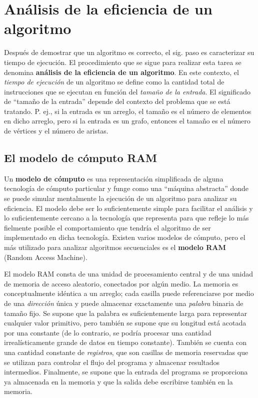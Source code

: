 \chapter{Análisis de la eficiencia de un algoritmo}

Después de demostrar que un algoritmo es correcto, el sig. paso es caracterizar su tiempo de ejecución. 
El procedimiento que se sigue para realizar esta tarea se denomina \textbf{análisis de la eficiencia de un algoritmo}. 
En este contexto, el \emph{tiempo de ejecución} de un algoritmo se define como la cantidad total de instrucciones que se ejecutan en función del \emph{tamaño de la entrada}. 
El significado de ``tamaño de la entrada'' depende del contexto del problema que se está tratando.
P. ej., si la entrada es un arreglo, el tamaño es el número de elementos en dicho arreglo, pero si la entrada es un grafo, entonces el tamaño es el número de vértices y el número de aristas. 

\section{El modelo de cómputo RAM}

Un \textbf{modelo de cómputo} es una representación simplificada de alguna tecnología de cómputo particular y funge como una ``máquina abstracta'' donde se puede simular mentalmente la ejecución de un algoritmo para analizar su eficiencia. 
El modelo debe ser lo suficientemente simple para facilitar el análisis y lo suficientemente cercano a la tecnología que representa para que refleje lo más fielmente posible el comportamiento que tendría el algoritmo de ser implementado en dicha tecnología. Existen varios modelos de cómputo, pero el más utilizado para analizar algoritmos secuenciales es el \textbf{modelo RAM} (Random Access Machine). 

El modelo RAM consta de una unidad de procesamiento central y de una unidad de memoria de acceso aleatorio, conectados por algún medio.
La memoria es conceptualmente idéntica a un arreglo; cada casilla puede referenciarse por medio de una \emph{dirección} única y puede almacenar exactamente una \emph{palabra} binaria de tamaño fijo.
Se supone que la palabra es suficientemente larga para representar cualquier valor primitivo, pero también se supone que su longitud está acotada por una constante (de lo contrario, se podría procesar una cantidad irrealísticamente grande de datos en tiempo constante).
También se cuenta con una cantidad constante de \emph{registros}, que son casillas de memoria reservadas que se utilizan para controlar el flujo del programa y almacenar resultados intermedios.
Finalmente, se supone que la entrada del programa se proporciona ya almacenada en la memoria y que la salida debe escribirse también en la memoria.
\newpage

